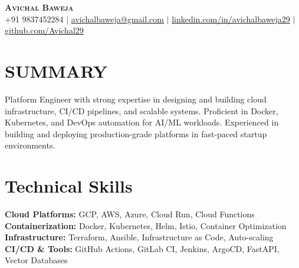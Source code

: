 \documentclass[letterpaper,10pt]{article}
\begin{document}
\begin{center}
    \textbf{\Huge \scshape Avichal Baweja} \\ \vspace{1pt}
    \small +91 9837452284 $|$ \href{mailto:avichalbaweja@gmail.com}{\underline{avichalbaweja@gmail.com}} $|$
    \href{https://www.linkedin.com/in/avichalbaweja29/}{\underline{linkedin.com/in/avichalbaweja29}} $|$
    \href{https://github.com/avichal29}{\underline{github.com/Avichal29}}
\end{center}

\section{SUMMARY}
Platform Engineer with strong expertise in designing and building cloud infrastructure, CI/CD pipelines, and scalable systems. Proficient in Docker, Kubernetes, and DevOps automation for AI/ML workloads. Experienced in building and deploying production-grade platforms in fast-paced startup environments.

\section{Technical Skills}
\begin{itemize}[leftmargin=0.2in, label={}]
    \small{\item{
    \textbf{Cloud Platforms:} GCP, AWS, Azure, Cloud Run, Cloud Functions \\
    \textbf{Containerization:} Docker, Kubernetes, Helm, Istio, Container Optimization \\
    \textbf{Infrastructure:} Terraform, Ansible, Infrastructure as Code, Auto-scaling \\
    \textbf{CI/CD \& Tools:} GitHub Actions, GitLab CI, Jenkins, ArgoCD, FastAPI, Vector Databases \\
    }}
\end{itemize}
\end{document}
